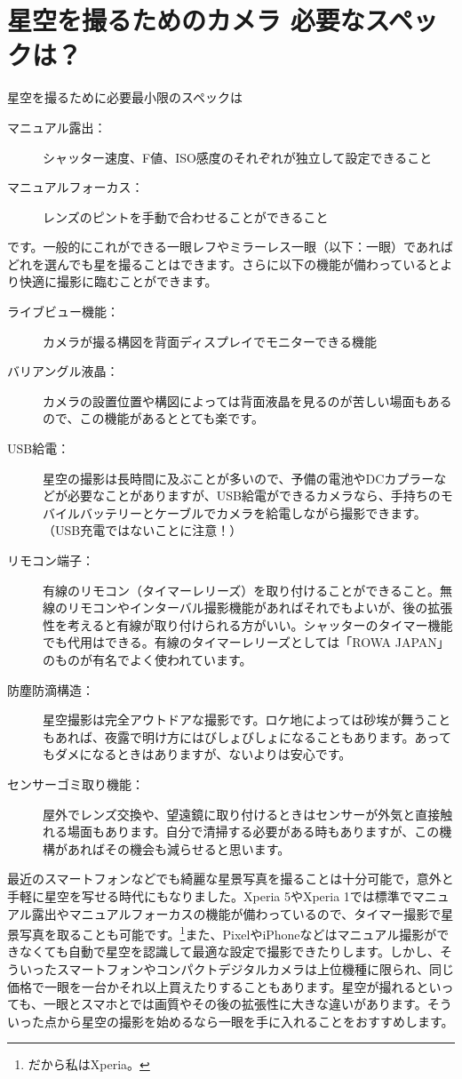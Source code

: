 \documentclass[../../super_nova_2023]{subfiles}
\begin{document}
\section{星空を撮るためのカメラ 必要なスペックは？}
星空を撮るために必要最小限のスペックは
\begin{description}
	\item[マニュアル露出：] シャッター速度、F値、ISO感度のそれぞれが独立して設定できること
		\item[マニュアルフォーカス：]レンズのピントを手動で合わせることができること
\end{description}
です。一般的にこれができる一眼レフやミラーレス一眼（以下：一眼）であればどれを選んでも星を撮ることはできます。さらに以下の機能が備わっているとより快適に撮影に臨むことができます。
\begin{description}
	\item[ライブビュー機能：] カメラが撮る構図を背面ディスプレイでモニターできる機能
	\item[バリアングル液晶：] カメラの設置位置や構図によっては背面液晶を見るのが苦しい場面もあるので、この機能があるととても楽です。
	\item[USB給電：] 星空の撮影は長時間に及ぶことが多いので、予備の電池やDCカプラーなどが必要なことがありますが、USB給電ができるカメラなら、手持ちのモバイルバッテリーとケーブルでカメラを給電しながら撮影できます。（USB充電ではないことに注意！）
	\item[リモコン端子：] 有線のリモコン（タイマーレリーズ）を取り付けることができること。無線のリモコンやインターバル撮影機能があればそれでもよいが、後の拡張性を考えると有線が取り付けられる方がいい。シャッターのタイマー機能でも代用はできる。有線のタイマーレリーズとしては「ROWA JAPAN」のものが有名でよく使われています。
	\item[防塵防滴構造：] 星空撮影は完全アウトドアな撮影です。ロケ地によっては砂埃が舞うこともあれば、夜露で明け方にはびしょびしょになることもあります。あってもダメになるときはありますが、ないよりは安心です。
	\item[センサーゴミ取り機能：] 屋外でレンズ交換や、望遠鏡に取り付けるときはセンサーが外気と直接触れる場面もあります。自分で清掃する必要がある時もありますが、この機構があればその機会も減らせると思います。
\end{description}
\begin{tcolorbox}[title=一眼じゃなきゃダメ？, breakable]
	最近のスマートフォンなどでも綺麗な星景写真を撮ることは十分可能で，意外と手軽に星空を写せる時代にもなりました。Xperia 5やXperia 1では標準でマニュアル露出やマニュアルフォーカスの機能が備わっているので、タイマー撮影で星景写真を取ることも可能です。\footnote{だから私はXperia。}また、PixelやiPhoneなどはマニュアル撮影ができなくても自動で星空を認識して最適な設定で撮影できたりします。しかし、そういったスマートフォンやコンパクトデジタルカメラは上位機種に限られ、同じ価格で一眼を一台かそれ以上買えたりすることもあります。星空が撮れるといっても、一眼とスマホとでは画質やその後の拡張性に大きな違いがあります。そういった点から星空の撮影を始めるなら一眼を手に入れることをおすすめします。
\end{tcolorbox}
\end{document}
